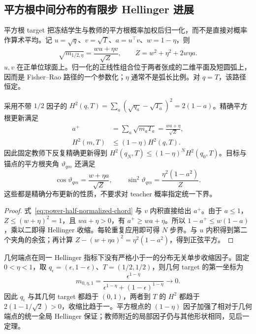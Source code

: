 \subsection{平方根中间分布的有限步 Hellinger 进展}

平方根 target 把冻结学生与教师的平方根概率加权后归一化，而不是直接对概率作算术平均。记 $u=\sqrt q$、$v=\sqrt T$、$a=u^\top v$、$w=1-\eta$，则
\begin{equation}
 \sqrt{m_{1/2,\eta}}=\frac{wu+\eta v}{\sqrt Z},\qquad
 Z=w^2+\eta^2+2w\eta a.
 \label{eq:power-half-normalized-chord}
\end{equation}
$u,v$ 在正单位球面上。归一化的正线性组合位于两者张成的二维平面及短圆弧上，因而是 Fisher--Rao 路径的一个参数化；$\eta$ 通常不是弧长比例。对 $q=T$，该路径恒定。

\begin{theorem}
\label{thm:power-half-discrete-contraction}
采用不带 $1/2$ 因子的 $H^2(q,T)=\sum_a(\sqrt{q_a}-\sqrt{T_a})^2=2(1-a)$。精确平方根更新满足
\begin{align}
 a^+&=\sum_a\sqrt{m_aT_a}=\frac{wa+\eta}{\sqrt Z},\\
 H^2(m,T)&\le(1-\eta)H^2(q,T).
 \label{eq:power-half-discrete-progress}
\end{align}
因此固定教师下反复精确更新得到 $H^2(q_N,T)\le(1-\eta)^NH^2(q_0,T)$。目标与锚点的平方根夹角 $\vartheta_{qm}$ 还满足
\begin{equation}
 \cos\vartheta_{qm}=\frac{w+\eta a}{\sqrt Z},\qquad
 \sin^2\vartheta_{qm}=\frac{\eta^2(1-a^2)}Z.
\end{equation}
这些都是精确分布更新的性质，不要求对 teacher 概率指定统一下界。
\end{theorem}

\begin{proof}
式~\eqref{eq:power-half-normalized-chord} 与 $v$ 内积直接给出 $a^+$。由于 $a\le1$，$Z\le(w+\eta)^2=1$，且 $wa+\eta>0$，有 $a^+\ge wa+\eta$。所以 $1-a^+\le w(1-a)$，乘以二即得 Hellinger 收缩。每轮重复应用即可得 $N$ 步界。与 $u$ 内积得到第二个夹角的余弦；再计算 $Z-(w+\eta a)^2=\eta^2(1-a^2)$，得到正弦平方。
\end{proof}

几何端点在同一 Hellinger 指标下没有严格小于一的分布无关单步收缩因子。固定 $0<\eta<1$，取 $q_\epsilon=(\epsilon,1-\epsilon)$、$T=(1/2,1/2)$，则几何 target 的第一坐标为
\begin{equation}
 m_{0,\eta,1}
 =\frac{\epsilon^{1-\eta}}{\epsilon^{1-\eta}+(1-\epsilon)^{1-\eta}}
 \longrightarrow0.
\end{equation}
因此 $q_\epsilon$ 与其几何 target 都趋于 $(0,1)$，两者到 $T$ 的 $H^2$ 都趋于 $2(1-1/\sqrt2)>0$，收缩比趋于一。平方根点的 $(1-\eta)$ 因子加强了相对于几何端点的统一全局 Hellinger 保证；教师附近的局部因子仍与其他形状相同，见后一定理。

